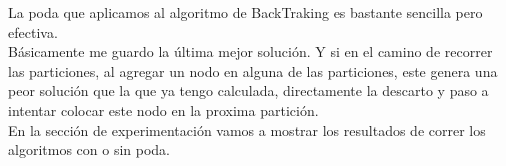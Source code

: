 La poda que aplicamos al algoritmo de BackTraking es bastante sencilla pero efectiva.\\
B\'asicamente me guardo la \'ultima mejor soluci\'on. Y si en el camino de recorrer las particiones, al agregar un nodo en alguna de las particiones, este genera una peor soluci\'on que la que ya tengo calculada, directamente la descarto y paso a intentar colocar este nodo en la proxima partici\'on.\\

En la secci\'on de experimentaci\'on vamos a mostrar los resultados de correr los algoritmos con o sin poda.



